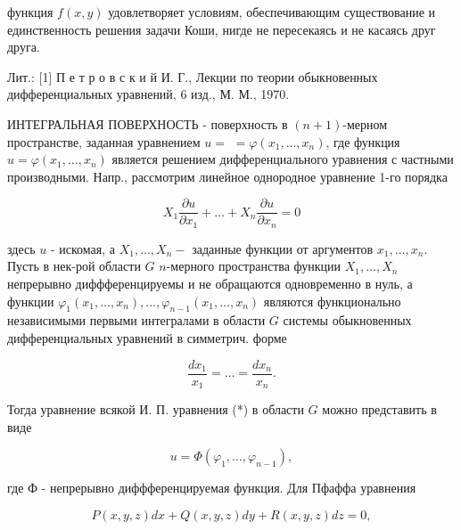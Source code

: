 \documentclass[10pt]{article}
\begin{document}
функция $f(x, y)$ удовлетворяет условиям, обеспечивающим существование и единственность решения задачи Коши, нигде не пересекаясь и не касаясь друг друга.



Лит.: [1] П е т р о в с к и й И. Г., Лекции по теории обыкновенных дифференциальных уравнений, 6 изд., М. М., 1970.



ИНТЕГРАЛЬНАЯ ПОВЕРХНОСТЬ - поверхность в $(n+1)$-мерном пространстве, заданная уравнением $u=$ $=\varphi\left(x_{1}, \ldots, x_{n}\right)$, где функция $u=\varphi\left(x_{1}, \ldots, x_{n}\right)$ является решением дифференциального уравнения с частными производными. Напр., рассмотрим линейное однородное уравнение 1-го порядка



\[

X_{1} \frac{\partial u}{\partial x_{1}}+\ldots+X_{n} \frac{\partial u}{\partial x_{n}}=0

\]



здесь $u$ - искомая, а $X_{1}, \ldots, X_{n}-$ заданные функции от аргументов $x_{1}, \ldots, x_{n}$. Пусть в нек-рой области $G$ $n$-мерного пространства функции $X_{1}, \ldots, X_{n}$ непрерывно диффференцируемы и не обращаются одновременно в нуль, а функции $\varphi_{1}\left(x_{1}, \ldots, x_{n}\right), \ldots, \varphi_{n-1}\left(x_{1}, \ldots, x_{n}\right)$ являются функционально независимыми первыми интегралами в области $G$ системы обыкновенных дифференциальных уравнений в симметрич. форме



\[

\frac{d x_{1}}{x_{1}}=\ldots=\frac{d x_{n}}{x_{n}} .

\]



Тогда уравнение всякой И. П. уравнения (*) в области $G$ можно представить в виде



\[

u=\Phi\left(\varphi_{1}, \ldots, \varphi_{n-1}\right),

\]



где Ф - непрерывно диффференцируемая функция. Для Пфаффа уравнения



\[

P(x, y, z) d x+Q(x, y, z) d y+R(x, y, z) d z=0,

\]
\end{document}
